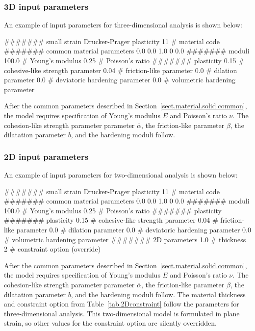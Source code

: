 \subsubsection{3D input parameters}
An example of input parameters for three-dimensional analysis is shown 
below:
\begin{inputfile}
####### small strain Drucker-Prager plasticity
11    # material code
####### common material parameters
0.0    0.0    1.0
0      0.0
####### moduli
100.0 # Young's modulus
0.25  # Poisson's ratio
####### plasticity
0.15  # cohesive-like strength parameter
0.04  # friction-like parameter
0.0	  # dilation parameter
0.0	  # deviatoric hardening parameter
0.0	  # volumetric hardening parameter
\end{inputfile}
After the common parameters described in 
Section~\ref{sect.material.solid.common}, the 
model requires specification of Young's modulus 
$E$ and Poisson's ratio $\nu$.
The cohesion-like strength parameter 
parameter $\bar{\alpha}$, the friction-like
parameter $\beta$, the dilatation
parameter $b$, and the hardening moduli follow.

\subsubsection{2D input parameters}
An example of input parameters for two-dimensional analysis is shown 
below:
\begin{inputfile}
####### small strain Drucker-Prager plasticity
11    # material code
####### common material parameters
0.0    0.0    1.0
0      0.0
####### moduli
100.0 # Young's modulus
0.25  # Poisson's ratio
####### plasticity
####### plasticity
0.15  # cohesive-like strength parameter
0.04  # friction-like parameter
0.0	  # dilation parameter
0.0	  # deviatoric hardening parameter
0.0	  # volumetric hardening parameter
####### 2D parameters
1.0   # thickness
2     # constraint option (override)
\end{inputfile}
After the common parameters described in 
Section~\ref{sect.material.solid.common}, the 
model requires specification of Young's modulus 
$E$ and Poisson's ratio $\nu$.
The cohesion-like strength parameter 
parameter $\bar{\alpha}$, the friction-like
parameter $\beta$, the dilatation
parameter $b$, and the hardening moduli follow.
The material thickness and 
constraint option from Table~\ref{tab.2Dconstraint} 
follow the parameters for three-dimensional analysis.
This two-dimensional model is formulated in plane strain,
so other values for the constraint option are silently
overridden.


